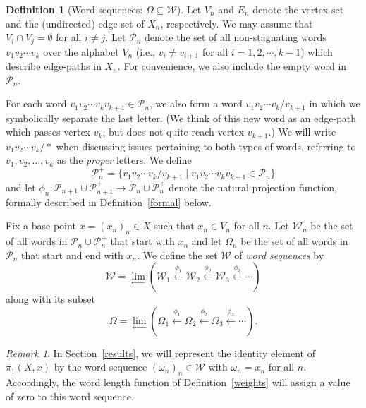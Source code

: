 \documentclass{amsart}
\theoremstyle{definition}
\newtheorem{definition}[theorem]{Definition}
\theoremstyle{remark}
\newtheorem{remark}[theorem]{Remark}
\numberwithin{equation}{section}
\begin{document}
\begin{definition}[Word sequences: $\Omega\subseteq {\mathcal W}$]\label{W}
Let $V_n$ and $E_n$ denote the vertex set and the (undirected) edge set of $X_n$, respectively. We may assume that $V_i\cap V_j=\emptyset$ for all $i\not=j$.
Let ${\mathcal P}_n$ denote the set of all non-stagnating words $v_1v_2\cdots v_k$  over the alphabet $V_n$  (i.e., $v_i\not=v_{i+1}$ for all $i=1,2,\cdots, k-1$) which describe edge-paths in $X_n$.
For convenience, we also include the empty word in ${\mathcal P}_n$.

For each word $v_1v_2\cdots v_{k}v_{k+1}\in {\mathcal P}_n$, we also form a word $v_1v_2\cdots v_{k}/v_{k+1}$ in which we symbolically separate the last letter. (We think of this new word as an edge-path which passes vertex $v_k$, but does not quite reach vertex $v_{k+1}$.) We will write
$v_1v_2\cdots v_{k}/\ast$ when discussing issues pertaining to both types of words, referring to $v_1, v_2, \dots, v_{k}$ as the {\em proper} letters.
We define \[{\mathcal P}^+_n=\{v_1v_2\cdots v_{k}/v_{k+1}\mid v_1v_2\cdots v_{k}v_{k+1}\in {\mathcal P}_n\}\] and let $\phi_n:{\mathcal P}_{n+1}\cup {\mathcal P}^+_{n+1}\rightarrow {\mathcal P}_n\cup {\mathcal P}^+_n$ denote the natural projection function, formally described in Definition~\ref{formal} below.

 Fix a base point $x=(x_n)_n\in X$ such that $x_n\in V_n$ for all $n$.
Let ${\mathcal W}_n$ be the set of all words in ${\mathcal P}_n\cup {\mathcal P}^+_n$ that start with $x_n$ and let $\Omega_n$ be the set of all words in ${\mathcal P}_n$ that start and end with $x_n$.
We define the set ${\mathcal W}$ of {\em word sequences} by
\[{\mathcal W}=\lim_{\longleftarrow} \left({\mathcal W}_1\stackrel{\phi_1}{\longleftarrow} {\mathcal W}_2
\stackrel{\phi_2}{\longleftarrow}{ \mathcal W}_3 \stackrel{\phi_3}{\longleftarrow}\cdots\right)\]
along with its subset
\[\Omega=\lim_{\longleftarrow}\left(\Omega_1\stackrel{\phi_1}{\longleftarrow} \Omega_2 \stackrel{\phi_2}{\longleftarrow} \Omega_3 \stackrel{\phi_3}{\longleftarrow} \cdots\right).\]
\end{definition}

\begin{remark}
In Section~\ref{results}, we will represent the identity element of $\pi_1(X,x)$ by the word sequence $(\omega_n)_n\in {\mathcal W}$ with $\omega_n=x_n$ for all $n$. Accordingly, the word length function of Definition~\ref{weights} will assign a value of zero to this word sequence.
\end{remark}
\end{document}
